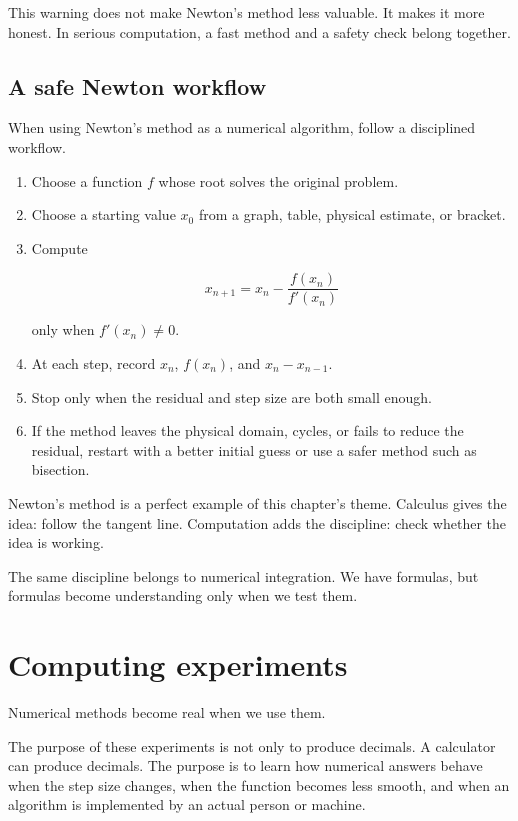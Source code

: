 This warning does not make Newton's method less valuable.  It makes it more honest.
In serious computation, a fast method and a safety check belong together.

\subsection{A safe Newton workflow}
\label{subsec:safe-newton-workflow}

When using Newton's method as a numerical algorithm, follow a disciplined workflow.

\begin{enumerate}
\item Choose a function \(f\) whose root solves the original problem.

\item Choose a starting value \(x_0\) from a graph, table, physical estimate, or bracket.

\item Compute

\[
x_{n+1}=x_n-\frac{f(x_n)}{f'(x_n)}
\]

only when \(f'(x_n)\neq0\).

\item At each step, record \(x_n\), \(f(x_n)\), and \(x_n-x_{n-1}\).

\item Stop only when the residual and step size are both small enough.

\item If the method leaves the physical domain, cycles, or fails to reduce the residual,
restart with a better initial guess or use a safer method such as bisection.
\end{enumerate}

Newton's method is a perfect example of this chapter's theme.  Calculus gives the idea:
follow the tangent line.  Computation adds the discipline: check whether the idea is
working.

The same discipline belongs to numerical integration.  We have formulas, but formulas
become understanding only when we test them.

\section{Computing experiments}
\label{sec:computing-experiments}

Numerical methods become real when we use them.

The purpose of these experiments is not only to produce decimals.  A calculator can
produce decimals.  The purpose is to learn how numerical answers behave when the
step size changes, when the function becomes less smooth, and when an algorithm is
implemented by an actual person or machine.

